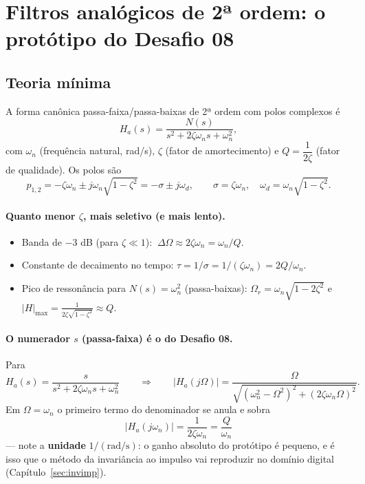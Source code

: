 \section{Filtros analógicos de 2ª ordem: o protótipo do Desafio 08}

\subsection*{Teoria mínima}

A forma canônica passa-faixa/passa-baixas de 2ª ordem com polos complexos é
\[
  H_a(s)=\frac{N(s)}{s^2+2\zeta\omega_n s+\omega_n^2},
\]
com $\omega_n$ (frequência natural, rad/s), $\zeta$ (fator de amortecimento) e
$Q=\dfrac{1}{2\zeta}$ (fator de qualidade). Os polos são
\[
  p_{1,2}=-\zeta\omega_n\pm j\omega_n\sqrt{1-\zeta^2}
         =-\sigma\pm j\omega_d,\qquad
  \sigma=\zeta\omega_n,\quad \omega_d=\omega_n\sqrt{1-\zeta^2}.
\]

\paragraph{Quanto menor $\zeta$, mais seletivo (e mais lento).}
\begin{itemize}
  \item Banda de $-3$ dB (para $\zeta\ll 1$): $\ \Delta\Omega\approx2\zeta\omega_n=\omega_n/Q$.
  \item Constante de decaimento no tempo: $\tau=1/\sigma=1/(\zeta\omega_n)=2Q/\omega_n$.
  \item Pico de ressonância para $N(s)=\omega_n^2$ (passa-baixas):
        $\Omega_r=\omega_n\sqrt{1-2\zeta^2}$ e
        $|H|_{\max}=\frac{1}{2\zeta\sqrt{1-\zeta^2}}\approx Q$.
\end{itemize}

\paragraph{O numerador $s$ (passa-faixa) é o do Desafio 08.} Para
\[
  H_a(s)=\frac{s}{s^2+2\zeta\omega_n s+\omega_n^2}
  \qquad\Longrightarrow\qquad
  |H_a(j\Omega)|=\frac{\Omega}{\sqrt{(\omega_n^2-\Omega^2)^2+(2\zeta\omega_n\Omega)^2}}.
\]
Em $\Omega=\omega_n$ o primeiro termo do denominador se anula e sobra
\[
  \boxed{\ |H_a(j\omega_n)|=\frac{1}{2\zeta\omega_n}=\frac{Q}{\omega_n}\ }
\]
— note a \textbf{unidade} $1/(\text{rad/s})$: o ganho absoluto do protótipo é
pequeno, e é isso que o método da invariância ao impulso vai reproduzir no
domínio digital (Capítulo~\ref{sec:invimp}).

